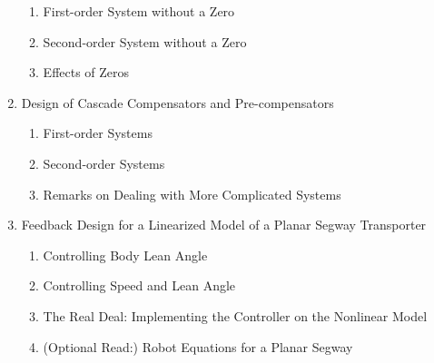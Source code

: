 \begin{enumerate}
\begin{enumerate}
    \item First-order System without a Zero 
  \item Second-order System without a Zero 
  \item Effects of Zeros 
  \end{enumerate}
  \item Design of Cascade Compensators and Pre-compensators 
    \begin{enumerate}
    \item First-order Systems 
  \item Second-order Systems
  \item Remarks on Dealing with More Complicated Systems 
  \end{enumerate}
  \item Feedback Design for a Linearized Model of a Planar Segway Transporter 
     \begin{enumerate}
  \item Controlling Body Lean Angle 
  \item Controlling Speed and Lean Angle
  \item The Real Deal: Implementing the Controller on the Nonlinear Model 
  \item (Optional Read:) Robot Equations for a Planar Segway 
  \end{enumerate}

\end{enumerate}


